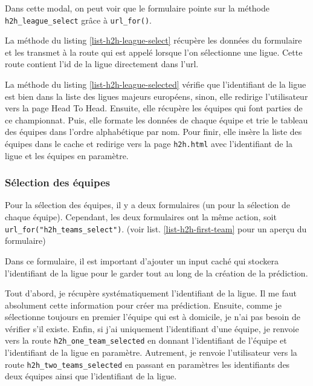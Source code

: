 \documentclass[a4paper,14pt]{extarticle}
\begin{document}
{

Dans cette modal, on peut voir que le formulaire pointe sur la méthode \texttt{h2h\_league\_select} grâce à \texttt{url\_for()}. 

La méthode du listing \ref{list-h2h-league-select} récupère les données du formulaire et les transmet à la route qui est appelé lorsque l'on sélectionne une ligue. Cette route contient l'id de la ligue directement dans l'url. 


La méthode du listing \ref{list-h2h-league-selected} vérifie que l'identifiant de la ligue est bien dans la liste des ligues majeurs européens, sinon, elle redirige l'utilisateur vers la page Head To Head. Ensuite, elle récupère les équipes qui font parties de ce championnat. Puis, elle formate les données de chaque équipe et trie le tableau des équipes dans l'ordre alphabétique par nom. Pour finir, elle insère la liste des équipes dans le cache et redirige vers la page \texttt{h2h.html} avec l'identifiant de la ligue et les équipes en paramètre.


\subsubsection{Sélection des équipes}

Pour la sélection des équipes, il y a deux formulaires (un pour la sélection de chaque équipe). Cependant, les deux formulaires ont la même action, soit \texttt{url\_for("h2h\_teams\_select")}. (voir list. \ref{list-h2h-first-team} pour un aperçu du formulaire)


Dans ce formulaire, il est important d'ajouter un input caché qui stockera l'identifiant de la ligue pour le garder tout au long de la création de la prédiction.


Tout d'abord, je récupère systématiquement l'identifiant de la ligue. Il me faut absolument cette information pour créer ma prédiction. Ensuite, comme je sélectionne toujours en premier l'équipe qui est à domicile, je n'ai pas besoin de vérifier s'il existe. Enfin, si j'ai uniquement l'identifiant d'une équipe, je renvoie vers la route \texttt{h2h\_one\_team\_selected} en donnant l'identifiant de l'équipe et l'identifiant de la ligue en paramètre. Autrement, je renvoie l'utilisateur vers la route \texttt{h2h\_two\_teams\_selected} en passant en paramètres les identifiants des deux équipes ainsi que l'identifiant de la ligue.

}
\end{document}
